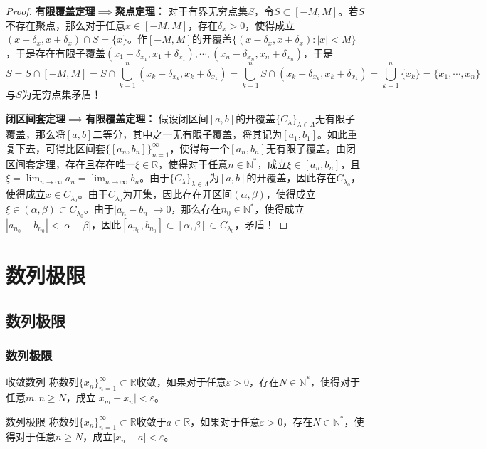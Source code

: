 \documentclass[lang = cn, scheme = chinese, thmcnt = section]{elegantbook}
\newcommand{\N}{\mathbb{N}}            %
\newcommand{\R}{\mathbb{R}}            %
\newcommand{\sub}{\subset}             %
\begin{document}
\begin{proof}
	{\bf 有限覆盖定理$\implies$聚点定理：}
	对于有界无穷点集$S$，令$S\sub[-M,M]$。若$S$不存在聚点，那么对于任意$x\in [-M,M]$，存在$\delta_x>0$，使得成立$(x-\delta_x,x+\delta_x)\cap S=\{x\}$。作$[-M,M]$的开覆盖$\{ (x-\delta_x,x+\delta_x):|x|<M \}$，于是存在有限子覆盖$(x_1-\delta_{x_1},x_1+\delta_{x_1}),\cdots,(x_n-\delta_{x_n},x_n+\delta_{x_n})$，于是%
	$$
	S
	=S\cap [-M,M]
	=S\cap\bigcup_{k=1}^{n}(x_k-\delta_{x_k},x_k+\delta_{x_k})
	=\bigcup_{k=1}^{n}S\cap(x_k-\delta_{x_k},x_k+\delta_{x_k})
	=\bigcup_{k=1}^{n}\{x_k\}
	=\{ x_1,\cdots,x_n \}
	$$
	与$S$为无穷点集矛盾！
	
	{\bf 闭区间套定理$\implies$有限覆盖定理：}
	假设闭区间$[a,b]$的开覆盖$\{ C_\lambda \}_{\lambda\in\Lambda}$无有限子覆盖，那么将$[a,b]$二等分，其中之一无有限子覆盖，将其记为$[a_1,b_1]$。如此重复下去，可得比区间套$\{[a_n,b_n]\}_{n=1}^{\infty}$，使得每一个$[a_n,b_n]$无有限子覆盖。由闭区间套定理，存在且存在唯一$\xi\in\R$，使得对于任意$n\in\N^*$，成立$\xi\in [a_n,b_n]$，且$\displaystyle \xi=\lim_{n\to\infty}a_n=\lim_{n\to\infty}b_n$。由于$\{ C_\lambda \}_{\lambda\in\Lambda}$为$[a,b]$的开覆盖，因此存在$C_{\lambda_0}$，使得成立$x\in C_{\lambda_0}$。由于$C_{\lambda_0}$为开集，因此存在开区间$(\alpha,\beta)$，使得成立$\xi\in(\alpha,\beta)\sub C_{\lambda_0}$。由于$|a_n-b_n|\to 0$，那么存在$n_0\in\N^*$，使得成立$|a_{n_0}-b_{n_0}|<|\alpha-\beta|$，因此$[a_{n_0},b_{n_0}]\sub[\alpha,\beta]\sub C_{\lambda_0}$，矛盾！
\end{proof}

\chapter{数列极限}

\section{数列极限}

\subsection{数列极限}

\begin{definition}{收敛数列}
	称数列$\{x_n\}_{n=1}^{\infty}\sub\R$收敛，如果对于任意$\varepsilon>0$，存在$N\in\N^*$，使得对于任意$m,n\ge N$，成立$|x_m-x_n|<\varepsilon$。
\end{definition}

\begin{definition}{数列极限}
	称数列$\{x_n\}_{n=1}^{\infty}\sub\R$收敛于$a\in\R$，如果对于任意$\varepsilon>0$，存在$N\in\N^*$，使得对于任意$n\ge N$，成立$|x_n-a|<\varepsilon$。
\end{definition}
\end{document}
